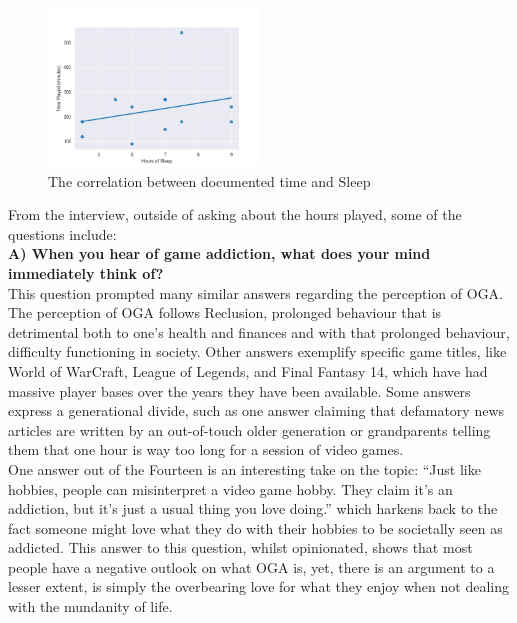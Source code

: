 \documentclass[conference]{IEEEtran}
\begin{document}
\begin{figure}[H]
\includegraphics[width = 0.5\textwidth]{Graph3}
\caption{The correlation between documented time and Sleep}
\label{figure8}
\end{figure}


From the interview, outside of asking about the hours played, some of the questions include:\\

 \textbf{A) When you hear of game addiction, what does your mind immediately think of?}\\

This question prompted many similar answers regarding the perception of OGA. The perception of OGA follows Reclusion, prolonged behaviour that is detrimental both to one’s health and finances and with that prolonged behaviour, difficulty functioning in society. Other answers exemplify specific game titles, like World of WarCraft\cite{Entertainment2004}, League of Legends\cite{Games2009}, and Final Fantasy 14\cite{Enix2013 }, which have had massive player bases over the years they have been available. Some answers express a generational divide, such as one answer claiming that defamatory news articles are written by an out-of-touch older generation or grandparents telling them that one hour is way too long for a session of video games.\\

One answer out of the Fourteen is an interesting take on the topic: “Just like hobbies, people can misinterpret a video game hobby. They claim it’s an addiction, but it’s just a usual thing you love doing.” which harkens back to the fact someone might love what they do with their hobbies to be societally seen as addicted. This answer to this question, whilst opinionated, shows that most people have a negative outlook on what OGA is, yet, there is an argument to a lesser extent, is simply the overbearing love for what they enjoy when not dealing with the mundanity of life.\\
\end{document}
